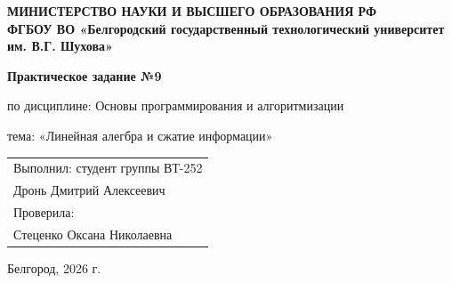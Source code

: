 \documentclass[a4paper,12pt]{article}
\begin{document}
\begin{titlepage}
    \centering
    {\bfseries МИНИСТЕРСТВО НАУКИ И ВЫСШЕГО ОБРАЗОВАНИЯ РФ \\
    ФГБОУ ВО «Белгородский государственный технологический университет им. В.Г. Шухова»\par}
    
    \vfill
    
    {\bfseries\Large Практическое задание №9\par}
    \vspace{0.5cm}
    {\large по дисциплине: Основы программирования и алгоритмизации \par}
    {\large тема: «Линейная алегбра и сжатие информации» \par}
    
    \vfill
    
    \begin{flushright}
    \begin{tabular}{l}
        \large Выполнил: студент группы ВТ-252 \\
        \large Дронь Дмитрий Алексеевич \\
        \large Проверила: \\
        \large Стеценко Оксана Николаевна
    \end{tabular}
    \end{flushright}
    
    \vfill
    
    {\large Белгород, 2026 г. \par}
\end{titlepage}
\end{document}
